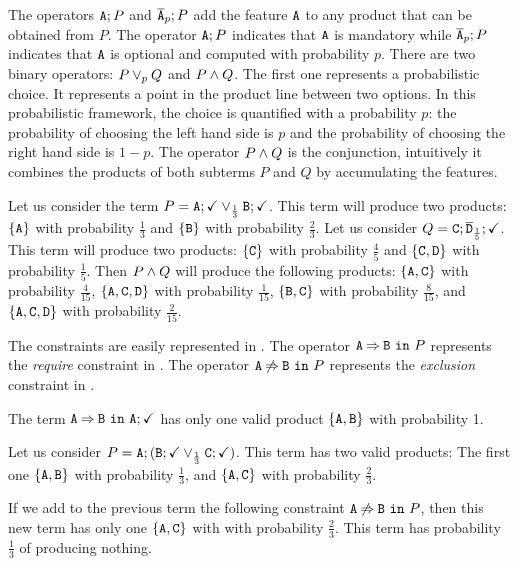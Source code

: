 The operators $\mathtt{A};P$ and $\overline{\mathtt{A}}_{p};P$ add the feature $\mathtt{A}$ to any product that can be obtained
from $P$. The operator $\mathtt{A};P$ indicates that $\mathtt{A}$ is mandatory while $\overline{\mathtt{A}}_{p};P$ indicates
that $\mathtt{A}$ is optional and computed with probability $p$.
There are two binary operators: $P \mathbin{\lor}_{p} Q$ and $P\mathbin{\wedge} Q$. The
first one represents a probabilistic choice. It represents a point in
the product line between two options. In this probabilistic framework,
the choice is quantified with a probability \(p\): the probability of
choosing the left hand side is \(p\) and the probability of choosing
the right hand side is \(1-p\). The operator $P\mathbin{\wedge} Q$ is the
conjunction, intuitively it combines the products of both subterms
\(P\) and \(Q\) by accumulating the features.

\begin{example}
  Let us consider the term
  $P=\mathtt{A};\checkmark\mathbin{\lor}_{\frac{1}{3}}{\mathtt{B}};\checkmark$. This
  term will produce two products: $\{{\mathtt{A}}\}$ with probability
  \(\frac{1}{3}\)
  and \(\{{\mathtt{B}}\}\) with probability \(\frac{2}{3}\).
  Let us consider $Q={\mathtt{C}};\overline{\mathtt{D}}_{\frac{1}{5}};\checkmark$. This term will
  produce
  two products: \(\{{\mathtt{C}}\}\) with probability \(\frac{4}{5}\) and
  \(\{{\mathtt{C}},{\mathtt{D}}\}\) with probability \(\frac{1}{5}\).
  Then \(P\mathbin{\wedge} Q\) will produce the following products:
  \(\{{\mathtt{A}},{\mathtt{C}}\}\) with probability \(\frac{4}{15}\),
  \(\{{\mathtt{A}},{\mathtt{C}},{\mathtt{D}}\}\) with probability \(\frac{1}{15}\),
  \(\{{\mathtt{B}},{\mathtt{C}}\}\) with probability \(\frac{8}{15}\), and
  \(\{{\mathtt{A}},{\mathtt{C}},{\mathtt{D}}\}\) with probability \(\frac{2}{15}\).

\end{example}

The constraints are easily represented in \fodaPAp.
The operator $\mathtt{A}\mathbin{\Rightarrow}\mathtt{B}\ \mathtt{in}\ P$ represents the \emph{require}
constraint in \FODA.
The operator $\mathtt{A}\mathbin{\not\Rightarrow}\mathtt{B}\ \mathtt{in}\ P$ represents the \emph{exclusion}
constraint in \FODA.

    \bex
      The term $\mathtt{A}\mathbin{\Rightarrow}\mathtt{B}\ \mathtt{in}\ \mathtt{A};\checkmark$ has only one valid
      product $\{\mathtt{A}, \mathtt{B}\}$ with  probability 1.

      Let us consider
      $P=\mathtt{A};(\mathtt{B};\checkmark\mathbin{\lor}_{\frac{1}{3}}\mathtt{C};\checkmark)$.
      This
      term has two valid products: The first one
      $\{\mathtt{A},\mathtt{B}\}$ with probability $\frac{1}{3}$,
      and $\{\mathtt{A}, \mathtt{C}\}$ with probability $\frac{2}{3}$.

      If we add to the previous term the following constraint
      $\mathtt{A}\mathbin{\not\Rightarrow}\mathtt{B}\ \mathtt{in}\ P$, then this new term  has only one
      $\{\mathtt{A},\mathtt{C}\}$ with  with probability
      $\frac{2}{3}$.
      This term has probability $\frac{1}{3}$ of producing nothing.
    \eex


